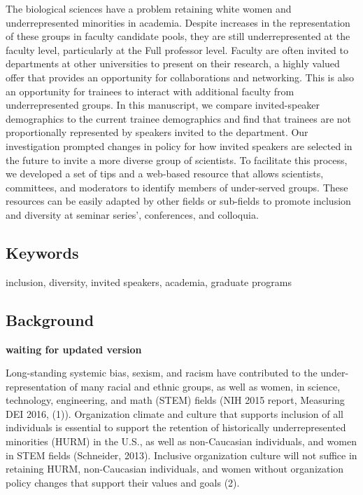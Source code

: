\documentclass[10pt,]{article}
\begin{document}
The biological sciences have a problem retaining white women and
underrepresented minorities in academia. Despite increases in the
representation of these groups in faculty candidate pools, they are
still underrepresented at the faculty level, particularly at the Full
professor level. Faculty are often invited to departments at other
universities to present on their research, a highly valued offer that
provides an opportunity for collaborations and networking. This is also
an opportunity for trainees to interact with additional faculty from
underrepresented groups. In this manuscript, we compare invited-speaker
demographics to the current trainee demographics and find that trainees
are not proportionally represented by speakers invited to the
department. Our investigation prompted changes in policy for how invited
speakers are selected in the future to invite a more diverse group of
scientists. To facilitate this process, we developed a set of tips and a
web-based resource that allows scientists, committees, and moderators to
identify members of under-served groups. These resources can be easily
adapted by other fields or sub-fields to promote inclusion and diversity
at seminar series', conferences, and colloquia.

\subsection{Keywords}\label{keywords}

inclusion, diversity, invited speakers, academia, graduate programs

\newpage

\subsection{Background}\label{background}

\textbf{waiting for updated version}

Long-standing systemic bias, sexism, and racism have contributed to the
under-representation of many racial and ethnic groups, as well as women,
in science, technology, engineering, and math (STEM) fields (NIH 2015
report, Measuring DEI 2016, (1)). Organization climate and culture that
supports inclusion of all individuals is essential to support the
retention of historically underrepresented minorities (HURM) in the
U.S., as well as non-Caucasian individuals, and women in STEM fields
(Schneider, 2013). Inclusive organization culture will not suffice in
retaining HURM, non-Caucasian individuals, and women without
organization policy changes that support their values and goals (2).
\end{document}

